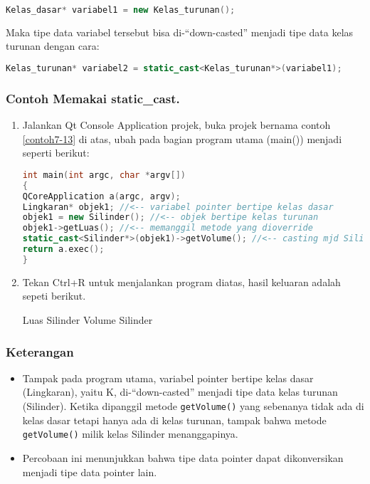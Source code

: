 \begin{lstlisting}[language=c++, numbers=none]
Kelas_dasar* variabel1 = new Kelas_turunan();
\end{lstlisting}

Maka tipe data variabel tersebut bisa di-``down-casted'' menjadi tipe
data kelas turunan dengan cara:

\begin{lstlisting}[language=c++, numbers=none]
Kelas_turunan* variabel2 = static_cast<Kelas_turunan*>(variabel1);
\end{lstlisting}

\subsubsection*{Contoh  Memakai static\_cast.}

\begin{enumerate}
\item Jalankan Qt Console Application projek, buka projek bernama contoh \ref{contoh7-13} di
atas, ubah pada bagian program utama (main()) menjadi seperti berikut:

\begin{lstlisting}[language=c++, caption=Memakai static\_cast, label=contoh7-14]
int main(int argc, char *argv[])
{
QCoreApplication a(argc, argv);
Lingkaran* objek1; //<-- variabel pointer bertipe kelas dasar
objek1 = new Silinder(); //<-- objek bertipe kelas turunan
objek1->getLuas(); //<-- memanggil metode yang dioverride
static_cast<Silinder*>(objek1)->getVolume(); //<-- casting mjd Silinder
return a.exec();
}
\end{lstlisting}

\item Tekan Ctrl+R untuk menjalankan program diatas, hasil keluaran adalah
sepeti berikut.

\begin{lcverbatim}
Luas Silinder
Volume Silinder
\end{lcverbatim}

\end{enumerate}

\subsubsection*{Keterangan}

\begin{itemize}

\item
  Tampak pada program utama, variabel pointer bertipe kelas dasar
  (Lingkaran), yaitu K, di-``down-casted'' menjadi tipe data kelas
  turunan (Silinder). Ketika dipanggil metode \texttt{getVolume()} yang
  sebenanya tidak ada di kelas dasar tetapi hanya ada di kelas turunan,
  tampak bahwa metode \texttt{getVolume()} milik kelas Silinder
  menanggapinya.
\item
  Percobaan ini menunjukkan bahwa tipe data pointer dapat dikonversikan
  menjadi tipe data pointer lain.
\end{itemize}

